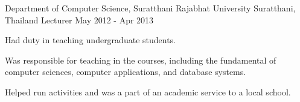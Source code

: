 \begin{cventries}
		\cvexperience
	{Department of Computer Science, Suratthani Rajabhat University}%
	{Suratthani, Thailand}%
	{Lecturer}%
	{May 2012 - Apr 2013}%
	{%
		\begin{cvitem}
			\item {Had duty in teaching undergraduate students.}
			\item {Was responsible for teaching in the courses, including the fundamental of computer sciences, computer applications, and database systems.}
			\item {Helped run activities and was a part of an academic service to a local school.}
		\end{cvitem}
	}%
\end{cventries}
